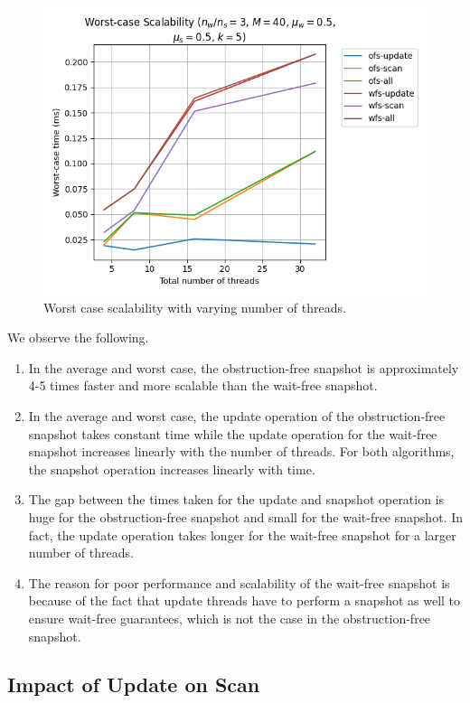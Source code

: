 \documentclass[conference,compsoc]{IEEEtran}
\begin{document}
\begin{figure}[!ht]
    \centering
    \includegraphics[width=\columnwidth]{images/exp2.png}
    \caption{Worst case scalability with varying number of threads.}
    \label{fig:exp2}
\end{figure}

We observe the following.
\begin{enumerate}
    \item In the average and worst case, the obstruction-free snapshot is
    approximately 4-5 times faster and more scalable than the wait-free
    snapshot.
    \item In the average and worst case, the update operation of the
    obstruction-free snapshot takes constant time while the update operation for
    the wait-free snapshot increases linearly with the number of threads. For
    both algorithms, the snapshot operation increases linearly with time.
    \item The gap between the times taken for the update and snapshot operation
    is huge for the obstruction-free snapshot and small for the wait-free
    snapshot. In fact, the update operation takes longer for the wait-free
    snapshot for a larger number of threads.
    \item The reason for poor performance and scalability of the wait-free
    snapshot is because of the fact that update threads have to perform a
    snapshot as well to ensure wait-free guarantees, which is not the case in
    the obstruction-free snapshot.
\end{enumerate}

\subsection{Impact of Update on Scan}
\label{susbec:impact-update-scan}
\end{document}
